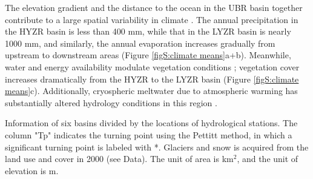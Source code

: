 \documentclass[hess, manuscript]{copernicus}
\begin{document}
The elevation gradient and the distance to the ocean in the UBR basin together contribute to a large spatial variability in climate \citep{sang2016precipitation}. The annual precipitation in the HYZR basin is less than 400 mm, while that in the LYZR basin is nearly 1000 mm, and similarly, the annual evaporation increases gradually from upstream to downstream areas (Figure \ref{figS:climate means}a+b). Meanwhile, water and energy availability modulate vegetation conditions \citep{li2019greening}; vegetation cover increases dramatically from the HYZR to the LYZR basin (Figure \ref{figS:climate means}c). Additionally, cryospheric meltwater due to atmospheric warming has substantially altered hydrology conditions in this region \citep{cuo2019warming,yao2010glacial,wang2021tp}.
\begin{table}[hb]
    \centering
    \caption{Information of six basins divided by the locations of hydrological stations. The column "Tp" indicates the turning point using the Pettitt method, in which a significant turning point is labeled with *. Glaciers and snow is acquired from the land use and cover in 2000 (see Data). The unit of area is km$^2$, and the unit of elevation is m.}
    

\end{table}
\end{document}
